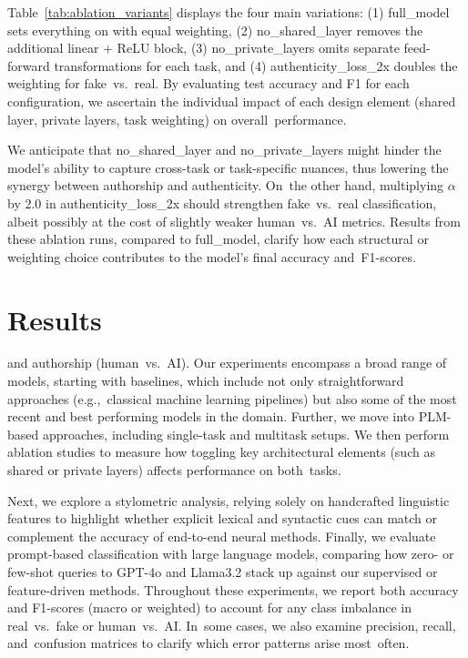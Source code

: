 \documentclass[electronics,article,accept,pdftex,moreauthors,electronics]{Definitions/mdpi}
\begin{document}
Table~\ref{tab:ablation_variants} displays the four main variations: 
(1) full\_model sets everything on with equal weighting, 
(2) no\_shared\_layer removes the additional linear + ReLU block, 
(3) no\_private\_layers omits separate feed-forward transformations for each task, 
and (4) authenticity\_loss\_2x doubles the weighting for fake~vs.~real. 
By evaluating test accuracy and F1 for each configuration, we ascertain the individual impact of each design element (shared layer, private layers, task weighting) on overall~performance.

We anticipate that no\_shared\_layer and no\_private\_layers might hinder the model’s ability to capture cross-task or task-specific nuances, thus lowering the synergy between authorship and authenticity. On~the other hand, multiplying \(\alpha\) by 2.0 in authenticity\_loss\_2x should strengthen fake~vs.~real classification, albeit possibly at the cost of 
slightly weaker human~vs.~AI metrics. Results from these ablation runs, compared to full\_model, clarify how each structural or weighting choice contributes to the model’s final accuracy and~F1-scores.



\section{Results}\label{S6}

 and authorship (human~vs.~AI). Our experiments encompass a broad range of models, starting with baselines, which include not only straightforward approaches (e.g.,~classical machine learning pipelines) but also some of the most recent and best performing models in the domain. Further, we move into PLM-based approaches, including single-task and multitask setups. We then perform ablation studies to measure how toggling key architectural elements (such as shared or private layers) affects performance on both~tasks. 

Next, we explore a stylometric analysis, relying solely on handcrafted linguistic features to highlight whether explicit lexical and syntactic cues can match or complement the accuracy of end-to-end neural methods. Finally, we evaluate prompt-based classification with large language models, comparing how zero- or few-shot queries to GPT-4o and Llama3.2 stack up against our supervised or feature-driven methods. Throughout these experiments, we report both accuracy and F1-scores (macro or weighted) to account for any class imbalance in real~vs.~fake or human~vs.~AI. In~some cases, we also examine precision, recall, and~confusion matrices to clarify which error patterns arise most~often.
\end{document}
